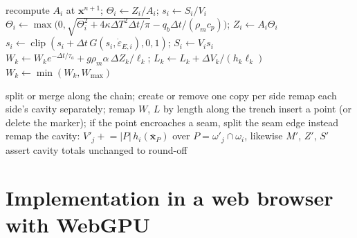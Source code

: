 \documentclass[11pt]{article}
\newcommand{\vect}[1]{\mathbf{#1}}
\newcommand{\edot}{\dot{\varepsilon}}
\begin{document}
\begin{algorithm}[H]
\caption{\textsc{Sources}: thermal, integrity and slab}\label{alg:sources}
\begin{algorithmic}[1]
  \State recompute $A_i$ at $\vect{x}^{n+1}$; $\Theta_i\gets Z_i/A_i$; $s_i\gets S_i/V_i$
  \State $\Theta_i\gets\max\!\big(0,\sqrt{\Theta_i^2+4\kappa\Delta T^2\Delta t/\pi}-q_b\Delta t/(\rho_mc_p)\big)$; $Z_i\gets A_i\Theta_i$
  \State $s_i\gets\operatorname{clip}(s_i+\Delta t\,G(s_i,\edot_{E,i}),0,1)$; $S_i\gets V_is_i$
\EndFor
{}
  \State $W_k\gets W_ke^{-\Delta t/\tau_a}+g\rho_m\alpha\,\Delta Z_k/\ell_k$; $L_k\gets L_k+\Delta V_k/(h_k\ell_k)$
  \State $W_k\gets\min(W_k,W_{\max})$ 
\EndFor
\end{algorithmic}
\end{algorithm}

\begin{algorithm}[H]
\caption{\textsc{Adapt}: conservative insertion and deletion}\label{alg:adapt}
\begin{algorithmic}[1]
    \State split or merge along the chain; create or remove one copy per side
    \State remap each side's cavity separately; remap $W$, $L$ by length along the trench
  \Else
    \State insert a point (or delete the marker); if the point encroaches a seam, split the seam edge instead
    \State remap the cavity: $V'_j\mathrel{+}=|P|\,h_i(\bar{\vect{x}}_P)$ over $P=\omega'_j\cap\omega_i$, likewise $M'$, $Z'$, $S'$
  \EndIf
  \State assert cavity totals unchanged to round-off
\EndFor
\end{algorithmic}
\end{algorithm}

\section{Implementation in a web browser with WebGPU}
\end{document}
